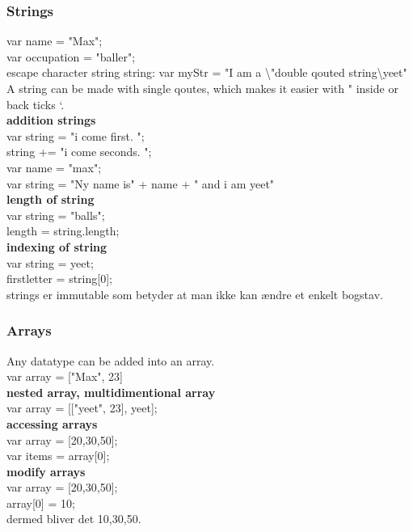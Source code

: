 \subsubsection{Strings}
var name = "Max";\\
var occupation = "baller";\\
escape character string string: var myStr = "I am a \textbackslash"double qouted string\textbackslash yeet"\\
A string can be made with single qoutes, which makes it easier with " inside or back ticks `.\\

\textbf{addition strings}\\
var string = "i come first. ";\\
string += "i come seconds. ";\\

var name = "max";\\
var string = "Ny name is" + name + " and i am yeet"\\

\textbf{length of string}\\
var string = "balls";\\
length = string.length;\\

\textbf{indexing of string}\\
var string = yeet;\\
firstletter = string[0];\\

strings er immutable som betyder at man ikke kan ændre et enkelt bogstav.\\

\subsubsection{Arrays}
Any datatype can be added into an array.\\
var array = ["Max", 23]\\

\textbf{nested array, multidimentional array}\\
var array = [["yeet", 23], yeet];\\

\textbf{accessing arrays}\\
var array = [20,30,50];\\
var items = array[0];\\

\textbf{modify arrays}\\
var array = [20,30,50];\\
array[0] = 10;\\
dermed bliver det 10,30,50.

